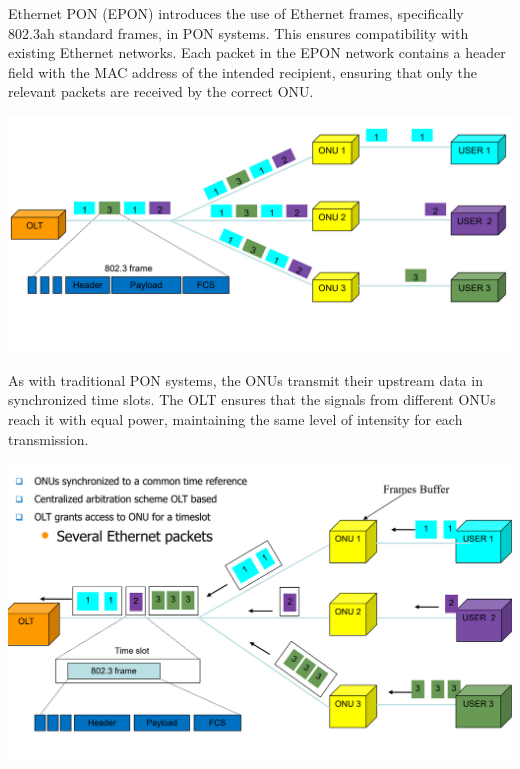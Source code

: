\documentclass[11pt, a4paper]{article}
\begin{document}
Ethernet PON (EPON) introduces the use of Ethernet frames, specifically 802.3ah standard
frames, in PON systems. This ensures compatibility with existing Ethernet networks. Each
packet in the EPON network contains a header field with the MAC address of the intended
recipient, ensuring that only the relevant packets are received by the correct ONU.
\begin{center}
    \includegraphics[scale=0.5]{img/AccessNetworks/PON/EPON_down.png}
\end{center}
As with traditional PON systems, the ONUs transmit their upstream data in synchronized time
slots. The OLT ensures that the signals from different ONUs reach it with equal power,
maintaining the same level of intensity for each transmission.
\begin{center}
    \includegraphics[scale=0.5]{img/AccessNetworks/PON/EPON_up.png}
\end{center}
\end{document}
